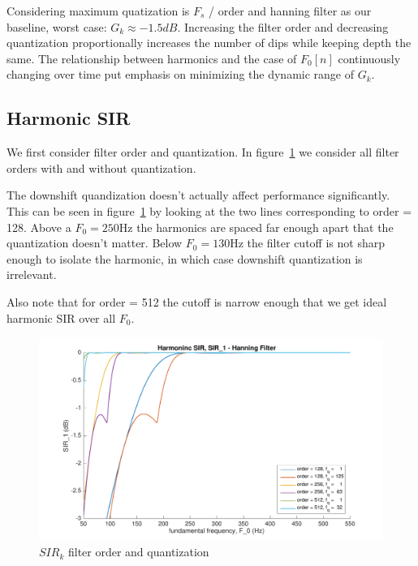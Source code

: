\documentclass [11pt, proquest] {uwthesis}[2015/03/03]
\begin{document}
Considering maximum quatization is $F_s$ / order and hanning filter as our baseline, worst case: $G_k \approx -1.5dB$.  Increasing the filter order and decreasing quantization proportionally increases the number of dips while keeping depth the same.  The relationship between harmonics and the case of $F_0[n]$ continuously changing over time put emphasis on minimizing the dynamic range of $G_k$.





\subsection{Harmonic SIR}

We first consider filter order and quantization.  In figure~\ref{fig:sir_k_1} we consider all filter orders with and without quantization.

The downshift quandization doesn't actually affect performance significantly.  This can be seen in figure~\ref{fig:sir_k_1} by looking at the two lines corresponding to order = 128.  Above a $F_0 = 250$Hz the harmonics are spaced far enough apart that the quantization doesn't matter.  Below $F_0 = 130$Hz the filter cutoff is not sharp enough to isolate the harmonic, in which case downshift quantization is irrelevant.

Also note that for order = 512 the cutoff is narrow enough that we get ideal harmonic SIR over all $F_0$.

\begin{figure}[!ht]
  \centering
    \includegraphics[width=1\textwidth]{sir_k_1}   
    \caption{$SIR_k$ filter order and quantization}\label{fig:sir_k_1}
\end{figure}
\end{document}
